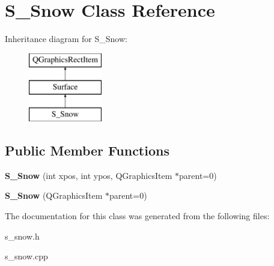 \hypertarget{class_s___snow}{}\section{S\+\_\+\+Snow Class Reference}
\label{class_s___snow}
Inheritance diagram for S\+\_\+\+Snow\+:\begin{figure}[H]
\begin{center}
\leavevmode
\includegraphics[height=3.000000cm]{class_s___snow}
\end{center}
\end{figure}
\subsection*{Public Member Functions}
\begin{DoxyCompactItemize}
\item 
\hypertarget{class_s___snow_a58b5eb7552b3082d105e9968acc7a9fb}{}{\bfseries S\+\_\+\+Snow} (int xpos, int ypos, Q\+Graphics\+Item $\ast$parent=0)\label{class_s___snow_a58b5eb7552b3082d105e9968acc7a9fb}

\item 
\hypertarget{class_s___snow_a19a17d0be19ecb0f85b1feff5aab697f}{}{\bfseries S\+\_\+\+Snow} (Q\+Graphics\+Item $\ast$parent=0)\label{class_s___snow_a19a17d0be19ecb0f85b1feff5aab697f}

\end{DoxyCompactItemize}


The documentation for this class was generated from the following files\+:\begin{DoxyCompactItemize}
\item 
s\+\_\+snow.\+h\item 
s\+\_\+snow.\+cpp\end{DoxyCompactItemize}
